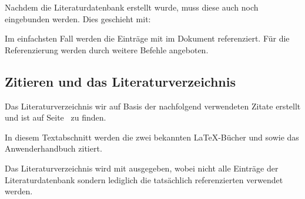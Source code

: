 \documentclass[%
  english,ngerman,%
  geometry=no,DIV=12,automark,%
]{tudscrartcl}
\begin{document}
%
Nachdem die Literaturdatenbank erstellt wurde, muss diese auch noch eingebunden 
werden. Dies geschieht mit:
%
\begin{Preamble}


\end{Preamble}
%
Im einfachsten Fall werden die Einträge mit  im 
Dokument referenziert. Für die Referenzierung werden durch  
weitere Befehle angeboten.
%
\begin{Trunk+}
\section{Zitieren und das Literaturverzeichnis}
Das Literaturverzeichnis wir auf Basis der nachfolgend verwendeten 
Zitate erstellt und ist auf Seite~\pageref{sec:bibliography} zu finden.
\end{Trunk+}
\begin{Trunk*}
In diesem Textabschnitt werden die zwei bekannten \LaTeX-Bücher
\cite{knuth84} und \cite{goossens94} sowie das Anwenderhandbuch
\cite{hanisch14} zitiert.

\end{Trunk*}
%
Das Literaturverzeichnis wird mit  ausgegeben, wobei 
nicht alle Einträge der Literaturdatenbank sondern lediglich die tatsächlich 
referenzierten verwendet werden.
%
\begin{Hint}
\printbibliography
\end{Hint}
\begin{quoting}[rightmargin=0pt]
\makeatletter
\let\markboth\@gobbletwo
\let\markright\@gobble
\makeatother
\vspace*{-\baselineskip}
\InputCode
\end{quoting}
\end{document}
